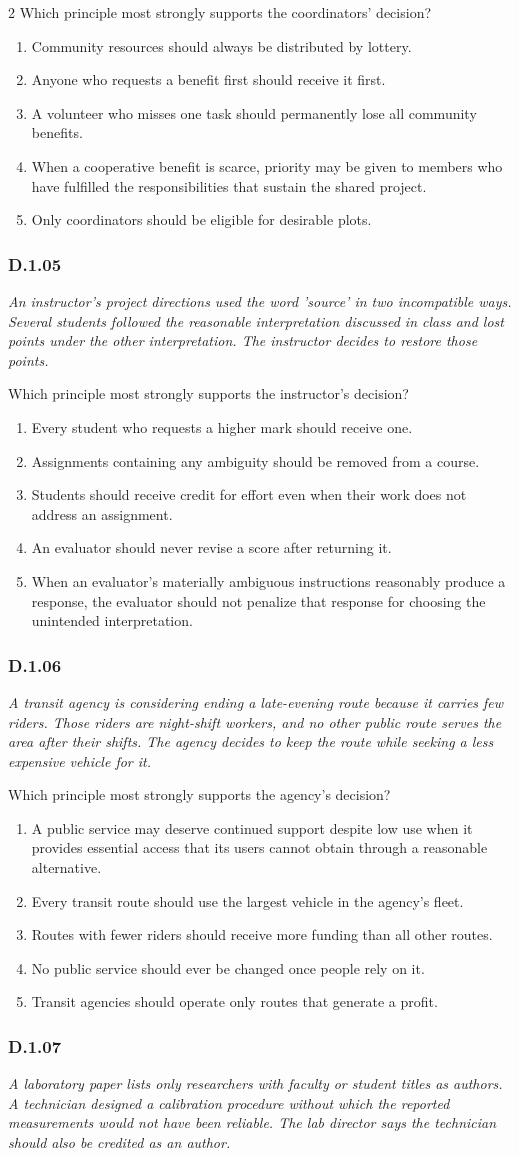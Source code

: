 \documentclass[10pt]{extarticle}
\newcommand{\choice}[1]{\item #1}
\newcommand{\bankitem}[1]{\subsubsection*{#1}}
\begin{document}
\begin{multicols}{2}
Which principle most strongly supports the coordinators' decision?
\begin{enumerate}[label=(\alph*)]
  \choice{Community resources should always be distributed by lottery.}
  \choice{Anyone who requests a benefit first should receive it first.}
  \choice{A volunteer who misses one task should permanently lose all community benefits.}
  \choice{When a cooperative benefit is scarce, priority may be given to members who have fulfilled the responsibilities that sustain the shared project.}
  \choice{Only coordinators should be eligible for desirable plots.}
\end{enumerate}
\bankitem{D.1.05}
\emph{An instructor's project directions used the word 'source' in two incompatible ways. Several students followed the reasonable interpretation discussed in class and lost points under the other interpretation. The instructor decides to restore those points.}

Which principle most strongly supports the instructor's decision?
\begin{enumerate}[label=(\alph*)]
  \choice{Every student who requests a higher mark should receive one.}
  \choice{Assignments containing any ambiguity should be removed from a course.}
  \choice{Students should receive credit for effort even when their work does not address an assignment.}
  \choice{An evaluator should never revise a score after returning it.}
  \choice{When an evaluator's materially ambiguous instructions reasonably produce a response, the evaluator should not penalize that response for choosing the unintended interpretation.}
\end{enumerate}
\bankitem{D.1.06}
\emph{A transit agency is considering ending a late-evening route because it carries few riders. Those riders are night-shift workers, and no other public route serves the area after their shifts. The agency decides to keep the route while seeking a less expensive vehicle for it.}

Which principle most strongly supports the agency's decision?
\begin{enumerate}[label=(\alph*)]
  \choice{A public service may deserve continued support despite low use when it provides essential access that its users cannot obtain through a reasonable alternative.}
  \choice{Every transit route should use the largest vehicle in the agency's fleet.}
  \choice{Routes with fewer riders should receive more funding than all other routes.}
  \choice{No public service should ever be changed once people rely on it.}
  \choice{Transit agencies should operate only routes that generate a profit.}
\end{enumerate}
\bankitem{D.1.07}
\emph{A laboratory paper lists only researchers with faculty or student titles as authors. A technician designed a calibration procedure without which the reported measurements would not have been reliable. The lab director says the technician should also be credited as an author.}


\end{multicols}
\end{document}
